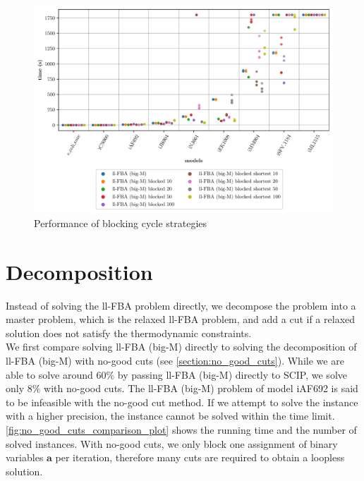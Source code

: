 \begin{figure}[h!]
    \centering
    \includegraphics[width=1.0\textwidth]{Images/cff_comparison_boxplot.pdf}
    \caption{Performance of blocking cycle strategies}
    \label{fig:cff_comparison}
\end{figure}

\newpage
\section{Decomposition} \label{section:results_cuts}
Instead of solving the \textsf{ll-FBA} problem directly, we decompose the problem into a master problem, which is the relaxed \textsf{ll-FBA} problem, and add a cut if a relaxed solution does not satisfy the thermodynamic constraints.\\
We first compare solving \textsf{ll-FBA (big-M)} directly to solving the decomposition of \textsf{ll-FBA (big-M)} with no-good cuts (see \cref{section:no_good_cuts}). While we are able to solve around $60\%$ by passing \textsf{ll-FBA (big-M)} directly to \textsf{SCIP}, we solve only $8\%$ with no-good cuts. The \textsf{ll-FBA (big-M)} problem of model \textsf{iAF692} is said to be infeasible with the no-good cut method. If we attempt to solve the instance with a higher precision, the instance cannot be solved within the time limit. \cref{fig:no_good_cuts_comparison_plot} shows the running time and the number of solved instances.
With no-good cuts, we only block one assignment of binary variables $\boldsymbol a$ per iteration, therefore many cuts are required to obtain a loopless solution.


